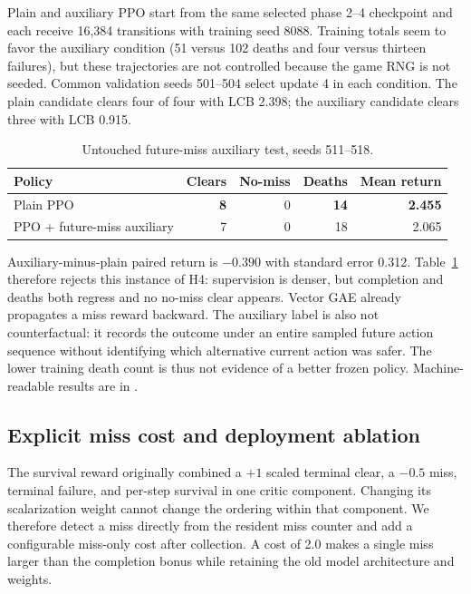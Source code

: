 \documentclass[10pt]{article}
\begin{document}
Plain and auxiliary PPO start from the same selected phase 2--4 checkpoint and
each receive 16,384 transitions with training seed 8088.  Training totals seem
to favor the auxiliary condition (51 versus 102 deaths and four versus thirteen
failures), but these trajectories are not controlled because the game RNG is
not seeded.  Common validation seeds 501--504 select update 4 in each condition.
The plain candidate clears four of four with LCB 2.398; the auxiliary candidate
clears three with LCB 0.915.

\begin{table}[ht]
  \centering
  \caption{Untouched future-miss auxiliary test, seeds 511--518.}
  \label{tab:auxiliary}
  \begin{tabular}{lrrrr}
    \toprule
    Policy & Clears & No-miss & Deaths & Mean return \\
    \midrule
    Plain PPO & \textbf{8} & 0 & \textbf{14} & \textbf{2.455} \\
    PPO + future-miss auxiliary & 7 & 0 & 18 & 2.065 \\
    \bottomrule
  \end{tabular}
\end{table}

Auxiliary-minus-plain paired return is $-0.390$ with standard error 0.312.
Table~\ref{tab:auxiliary} therefore rejects this instance of H4: supervision is
denser, but completion and deaths both regress and no no-miss clear appears.
Vector GAE already propagates a miss reward backward.  The auxiliary label is
also not counterfactual: it records the outcome under an entire sampled future
action sequence without identifying which alternative current action was safer.
The lower training death count is thus not evidence of a better frozen policy.
Machine-readable results are in
.

\subsection{Explicit miss cost and deployment ablation}

The survival reward originally combined a $+1$ scaled terminal clear, a
$-0.5$ miss, terminal failure, and per-step survival in one critic component.
Changing its scalarization weight cannot change the ordering within that
component.  We therefore detect a miss directly from the resident miss counter
and add a configurable miss-only cost after collection.  A cost of 2.0 makes a
single miss larger than the completion bonus while retaining the old model
architecture and weights.
\end{document}
